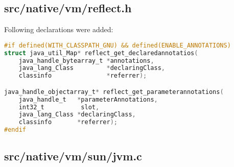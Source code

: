 \documentclass[a4paper, 10pt, titlepage]{scrartcl} %
\begin{document}
\subsection{src/native/vm/reflect.h}
\label{sec:src/native/vm/reflect.h}

Following declarations were added:
\begin{lstlisting}[language=C,firstnumber=65]
#if defined(WITH_CLASSPATH_GNU) && defined(ENABLE_ANNOTATIONS)
struct java_util_Map* reflect_get_declaredannotatios(
	java_handle_bytearray_t *annotations,
	java_lang_Class         *declaringClass,
	classinfo               *referrer);

java_handle_objectarray_t* reflect_get_parameterannotations(
	java_handle_t   *parameterAnnotations,
	int32_t          slot,
	java_lang_Class *declaringClass,
	classinfo       *referrer);
#endif
\end{lstlisting}

\subsection{src/native/vm/sun/jvm.c}
\label{sec:src/native/vm/sun/jvm.c}
\end{document}
